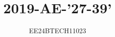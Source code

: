\documentclass[journal,12pt,onecolumn]{IEEEtran}
\theoremstyle{remark}
\begin{document}

\vspace{3cm}
\title{2019-AE-'27-39'}
\author{EE24BTECH11023}

{\let\newpage\relax\maketitle}

\renewcommand{\thefigure}{\theenumi}
\renewcommand{\thetable}{\theenumi}
\setlength{\intextsep}{10pt} %


\renewcommand{\thetable}{\theenumi}
\end{document}
